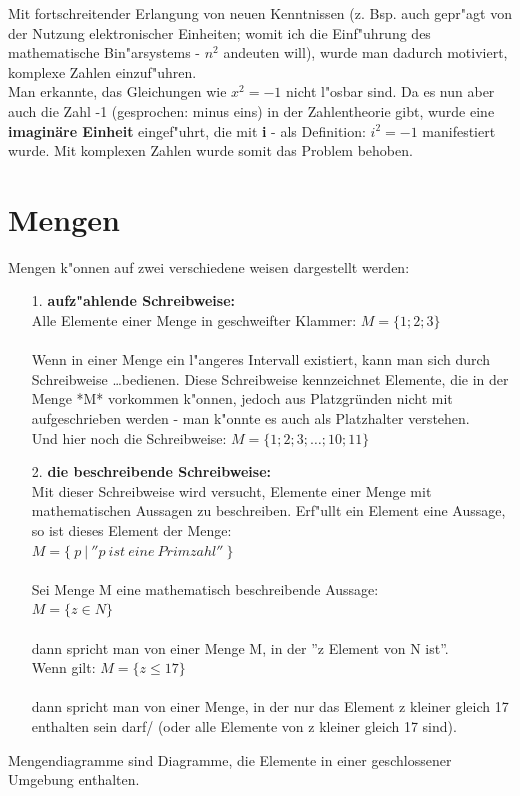 \documentclass[10pt]{book}
\begin{document}
\begin{itemize}
    Mit fortschreitender Erlangung von neuen Kenntnissen (z. Bsp. auch gepr"agt
    von der Nutzung elektronischer Einheiten; womit ich
    die Einf"uhrung des mathematische Bin"arsystems - $n^2$ andeuten will), wurde man
    dadurch motiviert, komplexe Zahlen einzuf"uhren.\\
    Man erkannte, das Gleichungen wie $x^2 = -1$ nicht l"osbar sind.
    Da es nun aber auch die Zahl -1 (gesprochen: minus eins) in der
    Zahlentheorie gibt, wurde eine \textbf{imaginäre Einheit} eingef"uhrt, die mit \textbf{i}
    - als Definition: \textbf{ $ i^2 = -1 $ }  manifestiert wurde.
    Mit komplexen Zahlen wurde somit das Problem behoben.
\end{itemize}


\chapter{Mengen}
Mengen k"onnen auf zwei verschiedene weisen dargestellt werden:
\begin{itemize}
  \item[1.]   \textbf{aufz"ahlende Schreibweise:}\\
  Alle Elemente einer Menge in geschweifter Klammer:
  $M = \{ 1;2;3 \}$ \\ \\
  Wenn in einer Menge ein l"angeres Intervall existiert,
  kann man sich durch Schreibweise \ldots bedienen.
  Diese Schreibweise kennzeichnet Elemente, die in der
  Menge *M* vorkommen k"onnen, jedoch aus Platzgründen
  nicht mit aufgeschrieben werden - man k"onnte es auch
  als Platzhalter verstehen. \\
  Und hier noch die Schreibweise: 
  $M = \{ 1;2;3; \ldots ;10;11 \}$
  \item[2.] \textbf{die beschreibende Schreibweise:} \\
  Mit dieser Schreibweise wird versucht, Elemente einer
  Menge mit mathematischen Aussagen zu beschreiben. Erf"ullt
  ein Element eine Aussage, so ist dieses Element der Menge: \\
  $M = \{ \: p \: | \: '' p \: ist \: eine \: Primzahl '' \: \}$ \\
  \\
  Sei Menge M eine mathematisch beschreibende Aussage:\\
  $M = \{z \in N \}$ \\
  \\
  dann spricht man von einer Menge M, in der ''z Element von N ist''. \\
  Wenn gilt: $M = \{z \le 17\}$\\
  \\
  dann spricht man von einer Menge, in der nur das Element z
  kleiner gleich 17 enthalten sein darf/ (oder alle Elemente
  von z kleiner gleich 17 sind). \\
\end{itemize}
Mengendiagramme sind Diagramme, die Elemente in einer
geschlossener Umgebung enthalten.
\end{document}
